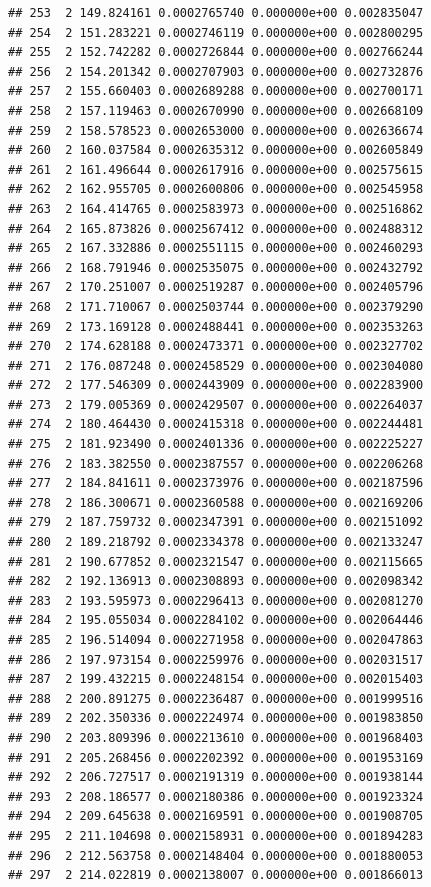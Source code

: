 \documentclass[article]{jss}\usepackage[]{graphicx}\usepackage[]{xcolor}
\makeatletter
\newenvironment{kframe}{%
 \def\at@end@of@kframe{}%
 \ifinner\ifhmode%
  \def\at@end@of@kframe{\end{minipage}}%
  \begin{minipage}{\columnwidth}%
 \fi\fi%
 \def\FrameCommand##1{\hskip\@totalleftmargin \hskip-\fboxsep
 \colorbox{shadecolor}{##1}\hskip-\fboxsep
     \hskip-\linewidth \hskip-\@totalleftmargin \hskip\columnwidth}%
 \MakeFramed {\advance\hsize-\width
   \@totalleftmargin\z@ \linewidth\hsize
   \@setminipage}}%
 {\par\unskip\endMakeFramed%
 \at@end@of@kframe}
\newenvironment{knitrout}{}{} %
\makeatother
\begin{document}
\begin{knitrout}
\begin{kframe}
\begin{verbatim}
## 253  2 149.824161 0.0002765740 0.000000e+00 0.002835047
## 254  2 151.283221 0.0002746119 0.000000e+00 0.002800295
## 255  2 152.742282 0.0002726844 0.000000e+00 0.002766244
## 256  2 154.201342 0.0002707903 0.000000e+00 0.002732876
## 257  2 155.660403 0.0002689288 0.000000e+00 0.002700171
## 258  2 157.119463 0.0002670990 0.000000e+00 0.002668109
## 259  2 158.578523 0.0002653000 0.000000e+00 0.002636674
## 260  2 160.037584 0.0002635312 0.000000e+00 0.002605849
## 261  2 161.496644 0.0002617916 0.000000e+00 0.002575615
## 262  2 162.955705 0.0002600806 0.000000e+00 0.002545958
## 263  2 164.414765 0.0002583973 0.000000e+00 0.002516862
## 264  2 165.873826 0.0002567412 0.000000e+00 0.002488312
## 265  2 167.332886 0.0002551115 0.000000e+00 0.002460293
## 266  2 168.791946 0.0002535075 0.000000e+00 0.002432792
## 267  2 170.251007 0.0002519287 0.000000e+00 0.002405796
## 268  2 171.710067 0.0002503744 0.000000e+00 0.002379290
## 269  2 173.169128 0.0002488441 0.000000e+00 0.002353263
## 270  2 174.628188 0.0002473371 0.000000e+00 0.002327702
## 271  2 176.087248 0.0002458529 0.000000e+00 0.002304080
## 272  2 177.546309 0.0002443909 0.000000e+00 0.002283900
## 273  2 179.005369 0.0002429507 0.000000e+00 0.002264037
## 274  2 180.464430 0.0002415318 0.000000e+00 0.002244481
## 275  2 181.923490 0.0002401336 0.000000e+00 0.002225227
## 276  2 183.382550 0.0002387557 0.000000e+00 0.002206268
## 277  2 184.841611 0.0002373976 0.000000e+00 0.002187596
## 278  2 186.300671 0.0002360588 0.000000e+00 0.002169206
## 279  2 187.759732 0.0002347391 0.000000e+00 0.002151092
## 280  2 189.218792 0.0002334378 0.000000e+00 0.002133247
## 281  2 190.677852 0.0002321547 0.000000e+00 0.002115665
## 282  2 192.136913 0.0002308893 0.000000e+00 0.002098342
## 283  2 193.595973 0.0002296413 0.000000e+00 0.002081270
## 284  2 195.055034 0.0002284102 0.000000e+00 0.002064446
## 285  2 196.514094 0.0002271958 0.000000e+00 0.002047863
## 286  2 197.973154 0.0002259976 0.000000e+00 0.002031517
## 287  2 199.432215 0.0002248154 0.000000e+00 0.002015403
## 288  2 200.891275 0.0002236487 0.000000e+00 0.001999516
## 289  2 202.350336 0.0002224974 0.000000e+00 0.001983850
## 290  2 203.809396 0.0002213610 0.000000e+00 0.001968403
## 291  2 205.268456 0.0002202392 0.000000e+00 0.001953169
## 292  2 206.727517 0.0002191319 0.000000e+00 0.001938144
## 293  2 208.186577 0.0002180386 0.000000e+00 0.001923324
## 294  2 209.645638 0.0002169591 0.000000e+00 0.001908705
## 295  2 211.104698 0.0002158931 0.000000e+00 0.001894283
## 296  2 212.563758 0.0002148404 0.000000e+00 0.001880053
## 297  2 214.022819 0.0002138007 0.000000e+00 0.001866013

\end{verbatim}
\end{kframe}
\end{knitrout}
\end{document}
